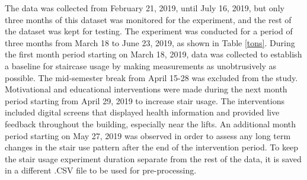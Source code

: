 \begin{itemize}





The data was collected from February 21, 2019, until July 16, 2019, but only three months of this dataset was monitored for the experiment, and the rest of the dataset was kept for testing. The experiment was conducted for a period of three months from March 18 to June 23, 2019, as shown in Table \ref{tons}. During the first month period starting on March 18, 2019, data was collected to establish a baseline for staircase usage by making measurements as unobtrusively as possible. The mid-semester break from April 15-28 was excluded from the study. Motivational and educational interventions were made during the next month period starting from April 29, 2019 to increase stair usage. The interventions included digital screens that displayed health information and provided live feedback throughout the building, especially near the lifts. An additional month period starting on May 27, 2019 was observed in order to assess any long term changes in the stair use pattern after the end of the intervention period. To keep the stair usage experiment duration separate from the rest of the data, it is saved in a different .CSV file to be used for pre-processing. 



\end{itemize}
